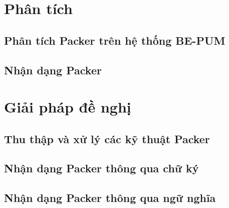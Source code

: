 \section{Phân tích}

\subsection {Phân tích Packer trên hệ thống BE-PUM}

\subsection {Nhận dạng Packer}

\section{Giải pháp đề nghị}

\subsection {Thu thập và xử lý các kỹ thuật Packer}

\subsection {Nhận dạng Packer thông qua chữ ký}

\subsection {Nhận dạng Packer thông qua ngữ nghĩa}

